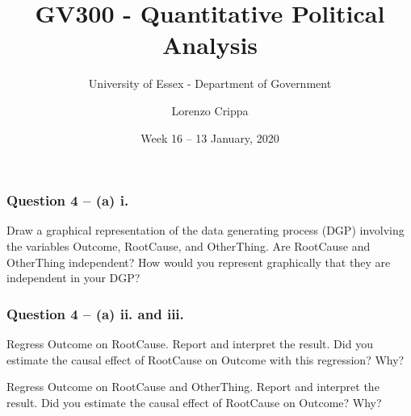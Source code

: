\documentclass[xcolor=table]{beamer}
\title{GV300 - Quantitative Political Analysis}
\subtitle{University of Essex - Department of Government}
\date{Week 16 -- 13 January, 2020}				%
\author{Lorenzo Crippa}
\begin{document}
\frame{
\titlepage
}



\begin{frame}[fragile]
\frametitle{Question 4 -- (a) i.}
Draw a graphical representation of the data generating process (DGP) involving
the variables Outcome, RootCause, and OtherThing. \pause Are RootCause and
OtherThing independent? \pause How would you represent graphically that they are independent in your DGP? \pause

\begin{center}
\end{center}
\end{frame}

\begin{frame}
\frametitle{Question 4 -- (a) ii. and iii.}
Regress Outcome on RootCause. Report and interpret the result. \pause Did you
estimate the causal effect of RootCause on Outcome with this regression? Why? \pause

Regress Outcome on RootCause and OtherThing. Report and interpret the result. \pause Did you estimate the causal effect of RootCause on Outcome? Why?
\end{frame}
\end{document}
